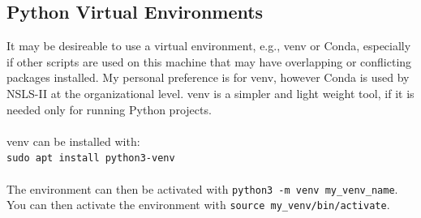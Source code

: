 \subsection*{Python Virtual Environments}
It may be desireable to use a virtual environment, e.g., venv or Conda, especially if other scripts are used on this machine that may have overlapping or conflicting packages installed. My personal preference is for venv, however Conda is used by NSLS-II at the organizational level. venv is a simpler and light weight tool, if it is needed only for running Python projects. \\\\
venv can be installed with:\\
\texttt{sudo apt install python3-venv}\\\\
The environment can then be activated with \texttt{python3 -m venv my\_venv\_name}. You can then activate the environment with \texttt{source my\_venv/bin/activate}. 

